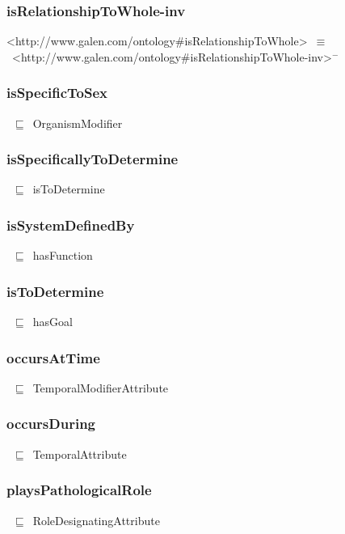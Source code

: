 \documentclass{article}
\begin{document}
\subsubsection*{isRelationshipToWhole-inv}

<http://www.galen.com/ontology#isRelationshipToWhole>~\ensuremath{\equiv}~<http://www.galen.com/ontology#isRelationshipToWhole-inv>\ensuremath{^-}

\subsubsection*{isSpecificToSex}

~\ensuremath{\sqsubseteq}~OrganismModifier

\subsubsection*{isSpecificallyToDetermine}

~\ensuremath{\sqsubseteq}~isToDetermine

\subsubsection*{isSystemDefinedBy}

~\ensuremath{\sqsubseteq}~hasFunction

\subsubsection*{isToDetermine}

~\ensuremath{\sqsubseteq}~hasGoal

\subsubsection*{occursAtTime}

~\ensuremath{\sqsubseteq}~TemporalModifierAttribute

\subsubsection*{occursDuring}

~\ensuremath{\sqsubseteq}~TemporalAttribute

\subsubsection*{playsPathologicalRole}

~\ensuremath{\sqsubseteq}~RoleDesignatingAttribute
\end{document}
